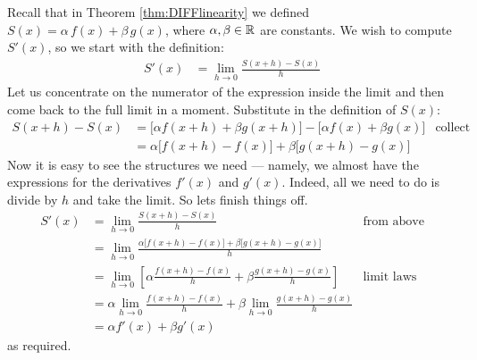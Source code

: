 Recall that in Theorem \ref{thm:DIFFlinearity} we defined
$S(x)=\alpha\,f(x)+\beta\,g(x)$, where $\alpha,\beta\in\mathbb{R}$
are constants. We wish to compute $S'(x)$, so we start with the definition:
\begin{align*}
  S'(x) &= \lim_{h \to 0} \frac{S(x+h)-S(x)}{h}
\end{align*}
Let us concentrate on the numerator of the expression inside the limit and then come
back to the full limit in a moment. Substitute in the definition of $S(x)$:
\begin{align*}
  S(x+h)-S(x) &=
  \big[ \alpha f(x+h) + \beta g(x+h) \big] -
  \big[ \alpha f(x) + \beta g(x) \big]  &\text{collect terms} \\
&=\alpha\big[f(x+h)-f(x)]+\beta\big[g(x+h)-g(x)\big]
\end{align*}
Now it is easy to see the structures we need --- namely, we almost have the expressions
for the derivatives $f'(x)$ and $g'(x)$. Indeed, all we need to do is divide by $h$ and
take the limit. So lets finish things off.
\begin{align*}
  S'(x) &= \lim_{h \to 0} \frac{S(x+h)-S(x)}{h} & \text{from above}\\
  &= \lim_{h \to 0} \frac{\alpha\big[f(x+h)-f(x)]+\beta\big[g(x+h)-g(x)\big] }{h} \\
  &= \lim_{h \to 0} \left[ \alpha\frac{f(x+h)-f(x)}{h} + \beta\frac{g(x+h)-g(x)}{h}
\right] &\text{limit laws}\\
  &= \alpha\lim_{h \to 0} \frac{f(x+h)-f(x)}{h} + \beta\lim_{h\to0}\frac{g(x+h)-g(x)}{h}
\\
  &=\alpha f'(x) + \beta g'(x)
\end{align*}
as required.

